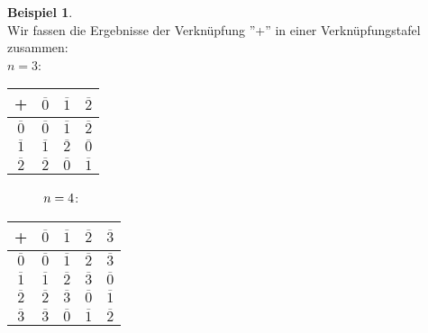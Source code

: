 \documentclass[10pt,a4paper,numbers=endperiod]{scrartcl}
\theoremstyle{definition}
\newtheorem{bsp}[satz]{Beispiel}
\begin{document}
\begin{bsp}
	$ $ \\
	Wir fassen die Ergebnisse der Verknüpfung ''+'' in einer Verknüpfungstafel zusammen:\\
	$n=3$: 
	\begin{tabular}{c|ccc}
		+&$\overline{0}$&$\overline{1}$&$\overline{2}$\\
		\hline
		$\overline{0}$&$\overline{0}$&$\overline{1}$&$\overline{2}$\\
		$\overline{1}$&$\overline{1}$&$\overline{2}$&$\overline{0}$\\
		$\overline{2}$&$\overline{2}$&$\overline{0}$&$\overline{1}$\\
	\end{tabular}
	$\hspace*{10mm}n=4$:
	\begin{tabular}{c|cccc}
		+&$\overline{0}$&$\overline{1}$&$\overline{2}$&$\overline{3}$\\
		\hline
		$\overline{0}$&$\overline{0}$&$\overline{1}$&$\overline{2}$&$\overline{3}$\\
		$\overline{1}$&$\overline{1}$&$\overline{2}$&$\overline{3}$&$\overline{0}$\\
		$\overline{2}$&$\overline{2}$&$\overline{3}$&$\overline{0}$&$\overline{1}$\\
		$\overline{3}$&$\overline{3}$&$\overline{0}$&$\overline{1}$&$\overline{2}$\\
	\end{tabular}
\end{bsp}
\end{document}
